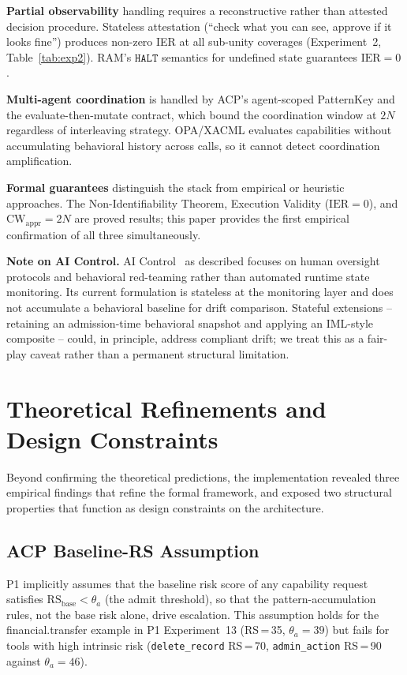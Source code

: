 \documentclass[11pt]{article}
\newcommand{\CW}{\mathrm{CW}}
\newcommand{\IER}{\mathrm{IER}}
\newcommand{\HALT}{\texttt{HALT}}
\newcommand{\RS}{\mathrm{RS}}
\begin{document}
\textbf{Partial observability} handling requires a reconstructive rather
than attested decision procedure.
Stateless attestation (``check what you can see, approve if it looks fine'')
produces non-zero IER at all sub-unity coverages (Experiment~2,
Table~\ref{tab:exp2}).
RAM's $\HALT$ semantics for undefined state guarantees $\IER=0$.

\textbf{Multi-agent coordination} is handled by ACP's agent-scoped
PatternKey and the evaluate-then-mutate contract, which bound the
coordination window at $2N$ regardless of interleaving strategy.
OPA/XACML evaluates capabilities without accumulating behavioral history
across calls, so it cannot detect coordination amplification.

\textbf{Formal guarantees} distinguish the stack from empirical or
heuristic approaches.
The Non-Identifiability Theorem, Execution Validity ($\IER=0$), and
$\CW_{\mathrm{appr}} = 2N$ are proved results; this paper provides the
first empirical confirmation of all three simultaneously.

\textbf{Note on AI Control.}
AI Control~\cite{greenblatt2024ai} as described focuses on human oversight
protocols and behavioral red-teaming rather than automated runtime state monitoring.
Its current formulation is stateless at the monitoring layer and does not
accumulate a behavioral baseline for drift comparison.
Stateful extensions -- retaining an admission-time behavioral snapshot and
applying an IML-style composite -- could, in principle, address compliant drift;
we treat this as a fair-play caveat rather than a permanent structural limitation.

\section{Theoretical Refinements and Design Constraints}
\label{sec:refinements}

Beyond confirming the theoretical predictions, the implementation revealed
three empirical findings that refine the formal framework, and exposed
two structural properties that function as design constraints on the
architecture.

\subsection{ACP Baseline-RS Assumption}

P1 implicitly assumes that the baseline risk score of any capability request
satisfies $\RS_{\mathrm{base}} < \theta_a$ (the admit threshold), so that the
pattern-accumulation rules, not the base risk alone, drive escalation.
This assumption holds for the financial.transfer example in P1 Experiment~13
(RS\,=\,35, $\theta_a = 39$) but fails for tools with high intrinsic risk
(\texttt{delete\_record} RS\,=\,70, \texttt{admin\_action} RS\,=\,90 against
$\theta_a = 46$).
\end{document}
